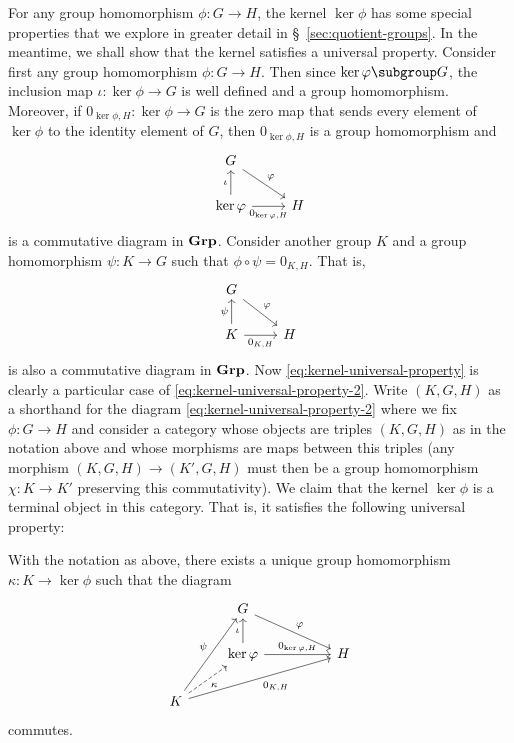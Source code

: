 For any group homomorphism \(\phi: G \to H\), the kernel \(\ker \phi\) has some
special properties that we explore in greater detail in
\S~\ref{sec:quotient-groups}. In the meantime, we shall show that the kernel
satisfies a universal property. Consider first any group homomorphism \(\phi: G
\to H\). Then since \(\ker \phi \subgroup G\), the inclusion map \(\iota: \ker
\phi \to G\) is well defined and a group homomorphism. Moreover, if
\(0_{\ker\phi, H}: \ker \phi \to G\) is the zero map that sends every element of
\(\ker \phi\) to the identity element of \(G\), then \(0_{\ker\phi, H}\) is a
group homomorphism and
\begin{equation}
    \label{eq:kernel-universal-property}
    \begin{tikzcd}
        G \arrow[rd, "\phi"]                        &   \\
        \ker\phi \arrow[u, "\iota"] \arrow[r, "0_{\ker\phi, H}"'] & H
    \end{tikzcd}
\end{equation}
is a commutative diagram in \(\mathbf{Grp}\). Consider another group \(K\) and a group
homomorphism \(\psi: K \to G\) such that \(\phi \circ \psi = 0_{K,H}\). That is,
\begin{equation}
    \label{eq:kernel-universal-property-2}
    \begin{tikzcd}
        G \arrow[rd, "\phi"]                        &   \\
        K \arrow[u, "\psi"] \arrow[r, "0_{K,H}"'] & H
    \end{tikzcd}
\end{equation}
is also a commutative diagram in \(\mathbf{Grp}\). Now
\eqref{eq:kernel-universal-property} is clearly a particular case of
\eqref{eq:kernel-universal-property-2}. Write \((K, G, H)\) as a shorthand for
the diagram \eqref{eq:kernel-universal-property-2} where we fix \(\phi: G \to
H\) and consider a category whose objects are triples \((K, G, H)\) as in the
notation above and whose morphisms are maps between this triples (any morphism
\((K, G, H) \to (K', G, H)\) must then be a group homomorphism \(\chi: K \to
K'\) preserving this commutativity). We claim that the kernel \(\ker \phi\) is a
terminal object in this category. That is, it satisfies the following universal
property:

\begin{theorem}
    With the notation as above, there exists a unique group homomorphism
    \(\kappa : K \to \ker \phi\) such that the diagram
    \[
        \begin{tikzcd}
            & G \arrow[rrd, "\phi"]                               &  &   \\
            & \ker\phi \arrow[u, "\iota"] \arrow[rr, "{0_{\ker\phi, H}}"] &  & H \\
        K \arrow[ruu, "\psi"] \arrow[rrru, "{0_{K,H}}"'] \arrow[ru, "\kappa"', dashed] &                                                     &  &  
        \end{tikzcd}
    \]
    commutes.
\end{theorem}


